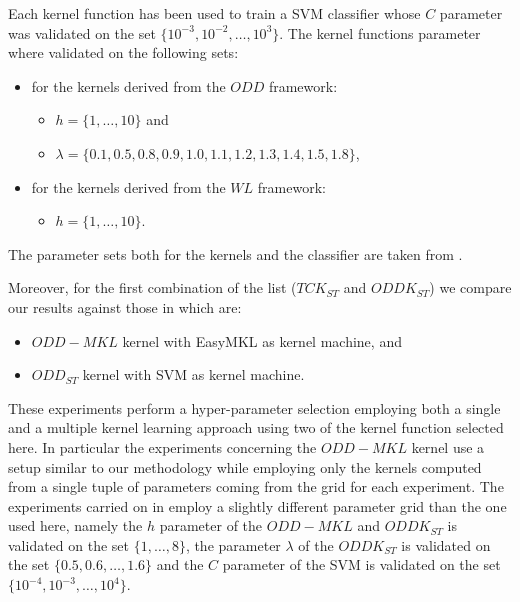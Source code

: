 Each kernel function has been used to train a SVM classifier whose $C$ parameter
was validated on the set $\{10^{-3},10^{-2},\dots,10^3\}$.
The kernel functions parameter where validated on the following sets:
\begin{itemize}
    \item for the kernels derived from the $ODD$ framework:
    \begin{itemize}
        \item $h=\{1,\dots,10\}$ and 
        \item $\lambda=\{0.1, 0.5, 0.8, 0.9, 1.0, 1.1, 1.2, 1.3, 1.4, 1.5, 1.8\}$,
    \end{itemize}
    \item for the kernels derived from the $WL$ framework:
    \begin{itemize}
        \item $h=\{1,\dots,10\}$.
    \end{itemize}
\end{itemize}
The parameter sets both for the kernels and the classifier are taken from \cite{rtesselli}.

Moreover, for the first combination of the list ($TCK_{ST}$ and $ODDK_{ST}$)
we compare our results against those in \cite{gmkl} which are:

\begin{itemize}
    \item $ODD-MKL$ kernel with EasyMKL as kernel machine, and
    \item $ODD_{ST}$ kernel with SVM as kernel machine.
\end{itemize}

These experiments perform a hyper-parameter selection employing both a single and 
a multiple kernel learning approach using two of the kernel function selected here.
In particular the experiments concerning the $ODD-MKL$ kernel use a setup similar to
our methodology while employing only the kernels computed from a single tuple of
parameters coming from the grid for each experiment.
The experiments carried on in \cite{gmkl} employ a slightly different parameter grid
than the one used here, namely the $h$ parameter of the $ODD-MKL$ and $ODDK_{ST}$ is
validated on the set $\{1,\dots,8\}$, the parameter $\lambda$ of the $ODDK_{ST}$ is 
validated on the set $\{0.5,0.6,\dots,1.6\}$ and the $C$ parameter of the SVM
is validated on the set $\{10^{-4},10^{-3},\dots,10^4\}$.

